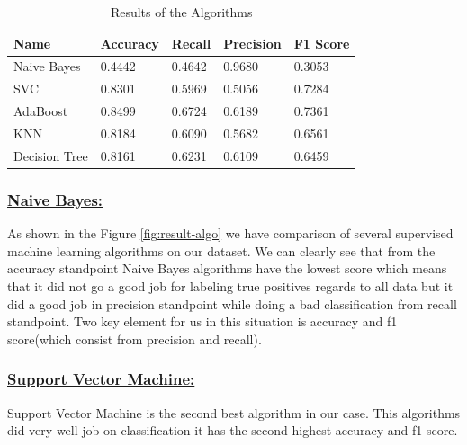 \documentclass[sigconf]{acmart}
\begin{document}
\begin{table}[!ht]
\centering
\begin{tabular}{lllll}
\hline
Name                                & Accuracy                    & Recall                      & Precision                   & F1 Score                    \\ \hline
\multicolumn{1}{|l|}{Naive Bayes}   & \multicolumn{1}{l|}{0.4442} & \multicolumn{1}{l|}{0.4642} & \multicolumn{1}{l|}{0.9680} & \multicolumn{1}{l|}{0.3053} \\ \hline
\multicolumn{1}{|l|}{SVC}           & \multicolumn{1}{l|}{0.8301} & \multicolumn{1}{l|}{0.5969} & \multicolumn{1}{l|}{0.5056} & \multicolumn{1}{l|}{0.7284} \\ \hline
\multicolumn{1}{|l|}{AdaBoost}      & \multicolumn{1}{l|}{0.8499} & \multicolumn{1}{l|}{0.6724} & \multicolumn{1}{l|}{0.6189} & \multicolumn{1}{l|}{0.7361} \\ \hline
\multicolumn{1}{|l|}{KNN}           & \multicolumn{1}{l|}{0.8184} & \multicolumn{1}{l|}{0.6090} & \multicolumn{1}{l|}{0.5682} & \multicolumn{1}{l|}{0.6561} \\ \hline
\multicolumn{1}{|l|}{Decision Tree} & \multicolumn{1}{l|}{0.8161} & \multicolumn{1}{l|}{0.6231} & \multicolumn{1}{l|}{0.6109} & \multicolumn{1}{l|}{0.6459} \\ \hline
\end{tabular}
\caption{Results of the Algorithms \cite{Borga2017}}
\label{result-table}
\end{table}

\subsubsection{\textbf{\underline{Naive Bayes:}}} 
As shown in the Figure \ref{fig:result-algo} we have comparison of several supervised machine learning algorithms on our dataset. We can clearly see that from the accuracy standpoint Naive Bayes algorithms have the lowest score which means that it did not go a good job for labeling true positives regards to all data but it did a good job in precision standpoint while doing a bad classification from recall standpoint. Two key element for us in this situation is accuracy and f1 score(which consist from precision and recall). 
\subsubsection{\textbf{\underline{Support Vector Machine:}}}
Support Vector Machine is the second best algorithm in our case. This algorithms did very well job on classification it has the second highest accuracy and f1 score. 
\end{document}
